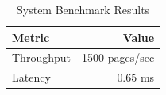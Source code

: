 \documentclass{article}
\begin{document}
\begin{table}[h]
\caption{System Benchmark Results}
\begin{tabular}{|l|r|}
\hline
\textbf{Metric} & \textbf{Value} \\
\hline
Throughput & 1500 pages/sec \\
Latency & 0.65 ms \\
\hline
\end{tabular}
\end{table}
\end{document}
